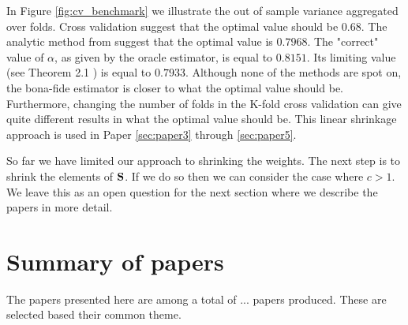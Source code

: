 \documentclass[oneside]{book}\usepackage{knitr}
\begin{document}
In Figure \ref{fig:cv_benchmark} we illustrate the out of sample variance aggregated over folds. 
Cross validation suggest that the optimal value should be $0.68$. 
The analytic method from \citet{bodnar2018estimation} suggest that the optimal value is $0.7968$.
The "correct" value of $\alpha$, as given by the oracle estimator, is equal to $0.8151$. 
Its limiting value (see Theorem 2.1 \citet{bodnar2018estimation}) is equal to $0.7933$.
Although none of the methods are spot on, the bona-fide estimator is closer to what the optimal value should be.
Furthermore, changing the number of folds in the K-fold cross validation can give quite different results in what the optimal value should be.
This linear shrinkage approach is used in Paper \ref{sec:paper3} through \ref{sec:paper5}.

So far we have limited our approach to shrinking the weights. 
The next step is to shrink the elements of $\mathbf{S}$.
If we do so then we can consider the case where $c>1$.
We leave this as an open question for the next section where we describe the papers in more detail.

\chapter{Summary of papers}\label{ch:papersummary}


The papers presented here are among a total of ... papers produced. These are selected based their common theme.
\end{document}
